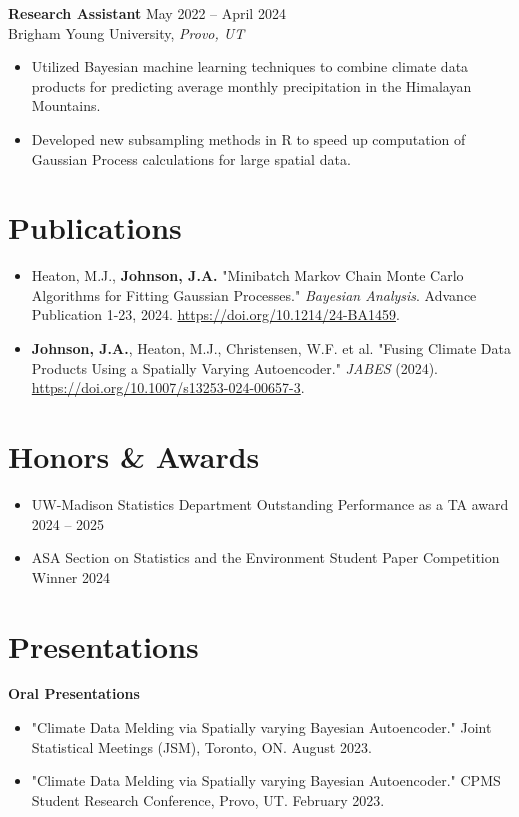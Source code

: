 \documentclass[11pt, letterpaper]{article}
\begin{document}
\vspace{6pt}
\textbf{Research Assistant} \hfill May 2022 -- April 2024 \\
\tab Brigham Young University, \textit{Provo, UT}
\begin{itemize}
    \item Utilized Bayesian machine learning techniques to combine climate data products for predicting average monthly precipitation in the Himalayan Mountains.
    \item Developed new subsampling methods in R to speed up computation of Gaussian Process calculations for large spatial data.
\end{itemize}

\section{Publications}
\begin{itemize}
    \item Heaton, M.J., \textbf{Johnson, J.A.} "Minibatch Markov Chain Monte Carlo Algorithms for Fitting Gaussian Processes." \textit{Bayesian Analysis}. Advance Publication 1-23, 2024. \url{https://doi.org/10.1214/24-BA1459}.
    \item \textbf{Johnson, J.A.}, Heaton, M.J., Christensen, W.F. et al. "Fusing Climate Data Products Using a Spatially Varying Autoencoder." \textit{JABES} (2024). \url{https://doi.org/10.1007/s13253-024-00657-3}.
\end{itemize}

\section{Honors \& Awards}
\begin{itemize}
    \item UW-Madison Statistics Department Outstanding Performance as a TA award \hfill 2024 -- 2025
    \item ASA Section on Statistics and the Environment Student Paper Competition Winner \hfill 2024
\end{itemize}

\section{Presentations}
\textbf{Oral Presentations}
\begin{itemize}
    \item "Climate Data Melding via Spatially varying Bayesian Autoencoder." Joint Statistical Meetings (JSM), Toronto, ON. August 2023.
    \item "Climate Data Melding via Spatially varying Bayesian Autoencoder." CPMS Student Research Conference, Provo, UT. February 2023.
\end{itemize}
\end{document}
